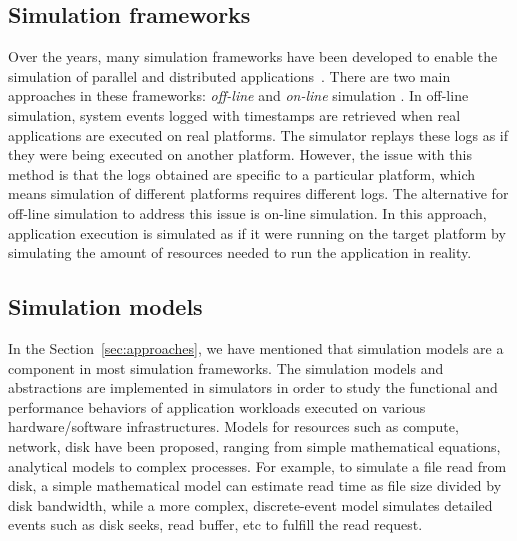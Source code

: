 \subsection{Simulation frameworks}

Over the years, many simulation frameworks have been developed to enable 
the simulation of parallel and distributed 
applications~\cite{optorsim, gridsim, groudsim, cloudsim,
nunez2012simcan,nunez2012icancloud, mdcsim, dissect_cf,
cloudnetsimplusplus, fognetsimplusplus, casanova2014simgrid,
ROSS, casanova2020fgcs}. 
There are two main approaches in these frameworks: \textit{off-line} and 
\textit{on-line} simulation \cite{casanova2014simgrid}. 
In off-line simulation, system events logged with timestamps are retrieved 
when real applications are executed on real platforms.
The simulator replays these logs as if they were being executed 
on another platform. 
However, the issue with this method is that the logs obtained are specific to 
a particular platform, which means simulation of different platforms 
requires different logs.
The alternative for off-line simulation to address this issue is 
on-line simulation.
In this approach, application execution is simulated as if it were running 
on the target platform by simulating the amount of resources needed 
to run the application in reality. 

\subsection{Simulation models}
\label{sec:simmodel}

In the Section~\ref{sec:approaches}, we have mentioned that simulation models are 
a component in most simulation frameworks.
The simulation models and abstractions are implemented in simulators 
in order to study the functional and performance behaviors of application 
workloads executed on various hardware/software infrastructures. 
Models for resources such as compute, network, disk have been proposed, 
ranging from simple mathematical equations, analytical models 
to complex processes.
For example, to simulate a file read from disk, a simple mathematical model 
can estimate read time as file size divided by disk bandwidth, 
while a more complex, discrete-event model simulates detailed events 
such as disk seeks, read buffer, etc to fulfill the read request.

